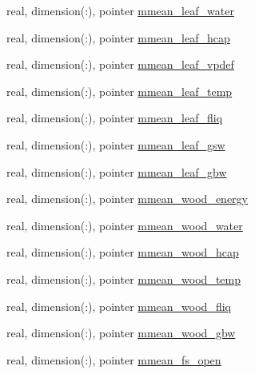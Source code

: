 \begin{DoxyCompactItemize}
\item 
real, dimension(\+:), pointer \hyperlink{structed__state__vars_1_1patchtype_ad145f7375eafc4dcc3106082901acb70}{mmean\+\_\+leaf\+\_\+water}
\item 
real, dimension(\+:), pointer \hyperlink{structed__state__vars_1_1patchtype_aa36ab40508712dcac5c502d192e931e5}{mmean\+\_\+leaf\+\_\+hcap}
\item 
real, dimension(\+:), pointer \hyperlink{structed__state__vars_1_1patchtype_a949042b580b85242d09c5aaf0cd71dac}{mmean\+\_\+leaf\+\_\+vpdef}
\item 
real, dimension(\+:), pointer \hyperlink{structed__state__vars_1_1patchtype_a26c616012b2aeb50ea0137e3cf84077f}{mmean\+\_\+leaf\+\_\+temp}
\item 
real, dimension(\+:), pointer \hyperlink{structed__state__vars_1_1patchtype_a21202f267fd84a18b6057804e1b94a20}{mmean\+\_\+leaf\+\_\+fliq}
\item 
real, dimension(\+:), pointer \hyperlink{structed__state__vars_1_1patchtype_a5bb2f7e6b710d0189175f81e4b15d701}{mmean\+\_\+leaf\+\_\+gsw}
\item 
real, dimension(\+:), pointer \hyperlink{structed__state__vars_1_1patchtype_a50eca53ca1b77596d619c4e2ea097cc2}{mmean\+\_\+leaf\+\_\+gbw}
\item 
real, dimension(\+:), pointer \hyperlink{structed__state__vars_1_1patchtype_aea30a2448059e99ffa22bbde10ee17f3}{mmean\+\_\+wood\+\_\+energy}
\item 
real, dimension(\+:), pointer \hyperlink{structed__state__vars_1_1patchtype_ace59c5dde7bee9ee8c80849d550c76d9}{mmean\+\_\+wood\+\_\+water}
\item 
real, dimension(\+:), pointer \hyperlink{structed__state__vars_1_1patchtype_a671d91218cc31ac0dc80a6035c16f973}{mmean\+\_\+wood\+\_\+hcap}
\item 
real, dimension(\+:), pointer \hyperlink{structed__state__vars_1_1patchtype_a381e0b31849a0fe959b5606ef2f7c552}{mmean\+\_\+wood\+\_\+temp}
\item 
real, dimension(\+:), pointer \hyperlink{structed__state__vars_1_1patchtype_a14d724dd7a937e05b5f5b7b87ae274bf}{mmean\+\_\+wood\+\_\+fliq}
\item 
real, dimension(\+:), pointer \hyperlink{structed__state__vars_1_1patchtype_a2601b3873089e83d2d5e239b1eea917f}{mmean\+\_\+wood\+\_\+gbw}
\item 
real, dimension(\+:), pointer \hyperlink{structed__state__vars_1_1patchtype_a33eaf21afc575ef8f9e37303a426858b}{mmean\+\_\+fs\+\_\+open}
\item 

\end{DoxyCompactItemize}
